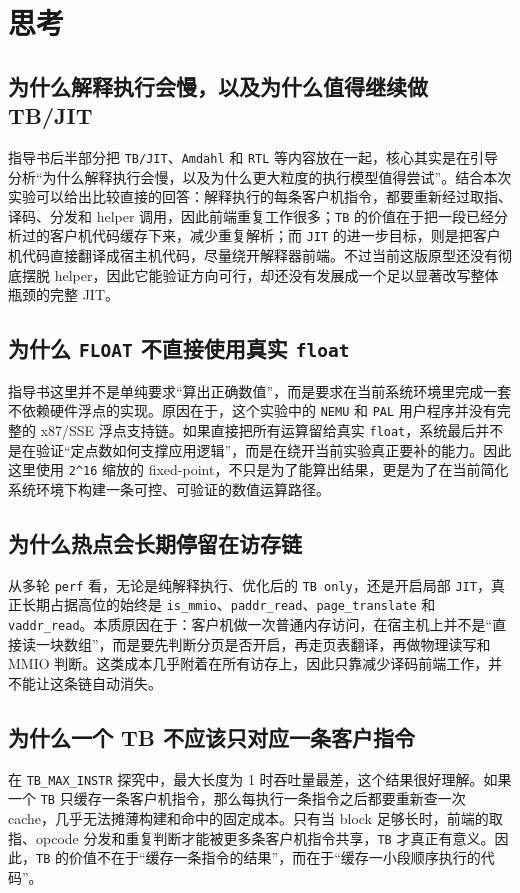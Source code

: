 \documentclass[a4paper]{article}
\begin{document}
\section{思考}

\subsection{为什么解释执行会慢，以及为什么值得继续做 TB/JIT}
指导书后半部分把 \texttt{TB/JIT}、\texttt{Amdahl} 和 \texttt{RTL} 等内容放在一起，核心其实是在引导分析“为什么解释执行会慢，以及为什么更大粒度的执行模型值得尝试”。结合本次实验可以给出比较直接的回答：解释执行的每条客户机指令，都要重新经过取指、译码、分发和 helper 调用，因此前端重复工作很多；\texttt{TB} 的价值在于把一段已经分析过的客户机代码缓存下来，减少重复解析；而 \texttt{JIT} 的进一步目标，则是把客户机代码直接翻译成宿主机代码，尽量绕开解释器前端。不过当前这版原型还没有彻底摆脱 helper，因此它能验证方向可行，却还没有发展成一个足以显著改写整体瓶颈的完整 JIT。

\subsection{为什么 \texttt{FLOAT} 不直接使用真实 \texttt{float}}
指导书这里并不是单纯要求“算出正确数值”，而是要求在当前系统环境里完成一套不依赖硬件浮点的实现。原因在于，这个实验中的 \texttt{NEMU} 和 \texttt{PAL} 用户程序并没有完整的 x87/SSE 浮点支持链。如果直接把所有运算留给真实 \texttt{float}，系统最后并不是在验证“定点数如何支撑应用逻辑”，而是在绕开当前实验真正要补的能力。因此这里使用 \texttt{2\^{}16} 缩放的 fixed-point，不只是为了能算出结果，更是为了在当前简化系统环境下构建一条可控、可验证的数值运算路径。

\subsection{为什么热点会长期停留在访存链}
从多轮 \texttt{perf} 看，无论是纯解释执行、优化后的 \texttt{TB only}，还是开启局部 \texttt{JIT}，真正长期占据高位的始终是 \texttt{is\_mmio}、\texttt{paddr\_read}、\texttt{page\_translate} 和 \texttt{vaddr\_read}。本质原因在于：客户机做一次普通内存访问，在宿主机上并不是“直接读一块数组”，而是要先判断分页是否开启，再走页表翻译，再做物理读写和 MMIO 判断。这类成本几乎附着在所有访存上，因此只靠减少译码前端工作，并不能让这条链自动消失。

\subsection{为什么一个 TB 不应该只对应一条客户指令}
在 \texttt{TB\_MAX\_INSTR} 探究中，最大长度为 1 时吞吐量最差，这个结果很好理解。如果一个 \texttt{TB} 只缓存一条客户机指令，那么每执行一条指令之后都要重新查一次 cache，几乎无法摊薄构建和命中的固定成本。只有当 block 足够长时，前端的取指、opcode 分发和重复判断才能被更多条客户机指令共享，\texttt{TB} 才真正有意义。因此，\texttt{TB} 的价值不在于“缓存一条指令的结果”，而在于“缓存一小段顺序执行的代码”。
\end{document}
